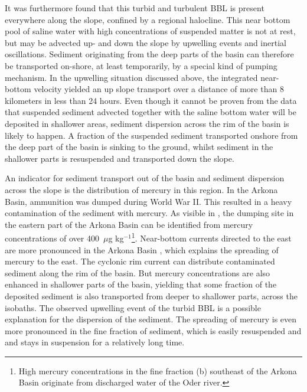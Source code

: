 It was furthermore found that this turbid and turbulent BBL is present 
everywhere 
along the slope, confined by a regional halocline. This near bottom pool of 
saline water with high concentrations of suspended matter is not at rest, but 
may be advected up- and down the slope by upwelling events and inertial 
oscillations. 
Sediment originating from the deep parts of the basin can therefore be 
transported on-shore, at least temporarily, by a special kind of pumping 
mechanism. In the upwelling situation 
discussed above, the integrated near-bottom velocity yielded an up slope 
transport over a distance of more than 8 kilometers in less than 24 hours. Even 
though it cannot be proven from the data that suspended sediment advected 
together with the saline bottom water will be deposited in shallower areas, 
sediment dispersion across the rim of the basin is likely to happen. 
A fraction of the suspended sediment transported onshore from the deep part of 
the basin is sinking to the ground, whilst sediment in the shallower parts is 
resuspended and transported down the slope.

An indicator for sediment transport out of the basin and sediment dispersion 
across the slope is the distribution of mercury in this region. In the Arkona 
Basin, ammunition was dumped during World War II. This resulted in a heavy 
contamination of the sediment with mercury. As visible in , the dumping 
site in the eastern part of the Arkona Basin can be identified from mercury 
concentrations of over 400~$\mu$g kg$^{-1}$\footnote{High mercury 
concentrations in the fine fraction (b) southeast of the Arkona Basin 
originate from discharged water of the Oder river.}. Near-bottom currents 
directed to the east are more pronounced in the Arkona Basin 
\citep[][]{lass1993}, which explains the spreading of mercury to the east. The 
cyclonic rim current can distribute contaminated sediment along the rim of the 
basin. But mercury concentrations are also enhanced in shallower parts of the 
basin, yielding that some fraction of the deposited sediment is also transported 
from deeper to shallower parts, across the isobaths. The observed upwelling 
event of the turbid BBL is a possible explanation for the dispersion of the 
sediment. The spreading of mercury is even more pronounced in the fine fraction 
of sediment, which is easily resuspended and and stays in suspension for a 
relatively long time.

